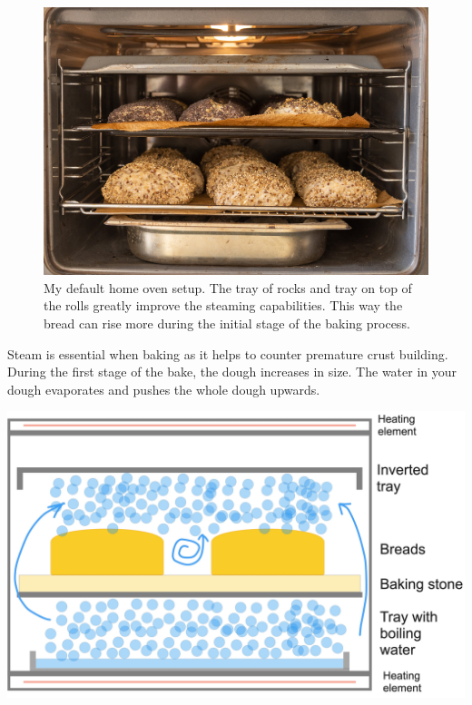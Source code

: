\begin{figure}[!htb]
  \includegraphics[width=\textwidth]{oven-example}
  \caption[Home oven baking example to maximize steam]{My default home oven setup. The tray of rocks
  and tray on top of the rolls greatly improve the steaming capabilities. This way the bread can
  rise more during the initial stage of the baking process.}
\end{figure}

Steam is essential when baking as it helps to counter premature
crust building. During the first stage of the bake, the dough
increases in size. The water in your dough evaporates and pushes
the whole dough upwards.

\begin{flowchart}[!htb]
  \includegraphics[width=\textwidth]{baking-process-steam.jpg}
  \caption[Steam building with inverted tray]{How steam builds in your oven
      using the later described inverted tray method.}%
      \label{flc:inverted-tray}
\end{flowchart}


